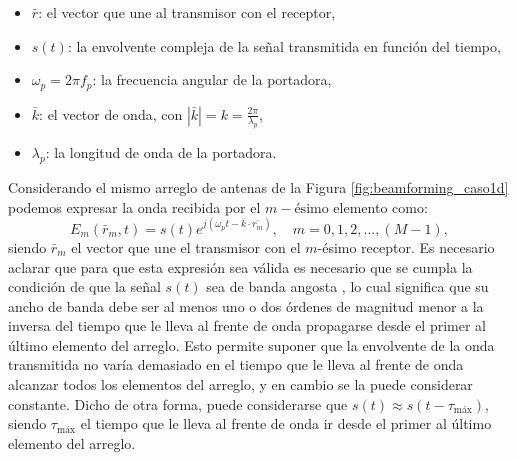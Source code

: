 \begin{itemize}
    \item $\bar{r}$: el vector que une al transmisor con el receptor,
    \item $s(t)$: la envolvente compleja de la señal transmitida en función del tiempo,
    \item $\omega_p=2\pi f_p$: la frecuencia angular de la portadora,
    \item $\bar{k}$: el vector de onda, con $|\bar{k}|=k=\frac{2\pi}{\lambda_p}$,
    \item ${\lambda_p}$: la longitud de onda de la portadora.
\end{itemize}

Considerando el mismo arreglo de antenas de la Figura \ref{fig:beamforming_caso1d} podemos expresar la onda recibida por el $m{-}\textrm{ésimo}$ elemento como:
\begin{equation}
    E_m(\bar{r}_m,t)=s(t)e^{j(\omega_p t - \bar{k}\cdot\bar{r_m})},\quad m=0,1,2,...,(M-1),
\end{equation}
siendo $\bar{r}_m$ el vector que une el transmisor con el $m$-ésimo receptor.
Es necesario aclarar que para que esta expresión sea válida es necesario que se cumpla la condición de que la señal $s(t)$ sea de banda angosta \cite{bib:2decadesbeamforming}, lo cual significa que su ancho de banda debe ser al menos uno o dos órdenes de magnitud menor a la inversa del tiempo que le lleva al frente de onda propagarse desde el primer al último elemento del arreglo. Esto permite suponer que la envolvente de la onda transmitida no varía demasiado en el tiempo que le lleva al frente de onda alcanzar todos los elementos del arreglo, y en cambio se la puede considerar constante. Dicho de otra forma, puede considerarse que $s(t)\approx s(t- \tau_{\textrm{máx}})$, siendo $\tau_{\textrm{máx}}$ el tiempo que le lleva al frente de onda ir desde el primer al último elemento del arreglo.

